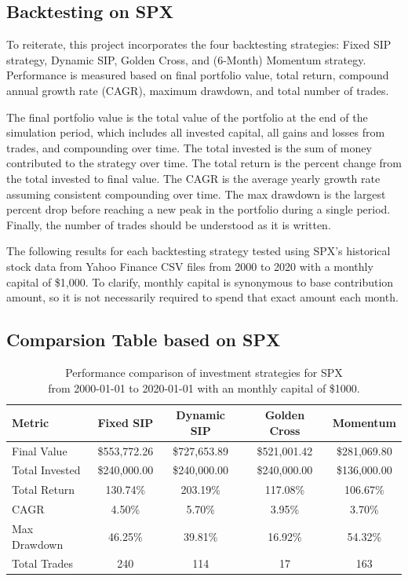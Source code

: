 \documentclass[12pt]{article}
\begin{document}
\subsection{Backtesting on SPX} 

To reiterate, this project incorporates the four backtesting strategies: Fixed SIP strategy, Dynamic SIP, 
Golden Cross, and (6-Month) Momentum strategy. 
Performance is measured based on final portfolio value, total return, compound annual growth rate (CAGR), 
maximum drawdown, and total number of trades. 

The final portfolio value is the total value of the portfolio at the end of the simulation period, which includes 
all invested capital, all gains and losses from trades, and compounding over time. 
The total invested is the sum of money contributed to the strategy over time. 
The total return is the percent change from the total invested to final value. 
The CAGR is the average yearly growth rate assuming consistent compounding over time. 
The max drawdown is the largest percent drop before reaching a new peak in the portfolio during a single period. 
Finally, the number of trades should be understood as it is written. 

The following results for each backtesting strategy tested using SPX's historical stock data from Yahoo Finance 
CSV files from 2000 to 2020 with a monthly capital of \$1,000. 
To clarify, monthly capital is synonymous to base contribution amount, so it is not necessarily required to spend 
that exact amount each month. 

\subsection{Comparsion Table based on SPX}

\begin{table}[H]
\centering
\begin{tabular}{|l|c|c|c|c|}
\hline
\textbf{Metric} & \textbf{Fixed SIP} & \textbf{Dynamic SIP} & \textbf{Golden Cross} & \textbf{Momentum} \\
\hline
Final Value & \$553,772.26 & \$727,653.89 & \$521,001.42 & \$281,069.80 \\
Total Invested & \$240,000.00 & \$240,000.00 & \$240,000.00 & \$136,000.00 \\
Total Return & 130.74\% & 203.19\% & 117.08\% & 106.67\% \\
CAGR & 4.50\% & 5.70\% & 3.95\% & 3.70\% \\
Max Drawdown & 46.25\% & 39.81\% & 16.92\% & 54.32\% \\
Total Trades & 240 & 114 & 17 & 163 \\
\hline
\end{tabular}
\caption{Performance comparison of investment strategies for SPX\\ from 
2000-01-01 to 2020-01-01 with an monthly capital of \$1000.}
\end{table}
\end{document}
